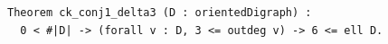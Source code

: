 \begin{lstlisting}[language=Rocq]
Theorem ck_conj1_delta3 (D : orientedDigraph) :
  0 < #|D| -> (forall v : D, 3 <= outdeg v) -> 6 <= ell D.
\end{lstlisting}
